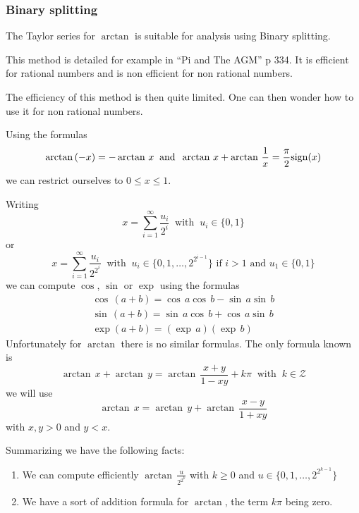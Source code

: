 \documentclass[12pt]{amsart}
\def\Z{{\mathcal Z}}
\begin{document}
\subsubsection{Binary splitting}
\noindent The Taylor series for $\arctan$ is suitable for analysis using Binary splitting.
\par This method is detailed for example in ``Pi and The AGM'' p 334. It is efficient for rational numbers and is non efficient for non rational numbers.
\par The efficiency of this method is then quite limited. One can then wonder how to use it for non rational numbers.
\par Using the formulas
\begin{equation*}
\arctan\,(-x)=-\arctan\,x\;\;\mbox{and}\;\;\arctan\,x+\arctan\,\frac{1}{x}=\frac{\pi}{2}{\rm sign}(x)
\end{equation*}
we can restrict ourselves to $0\leq x\leq 1$.
\par Writing
\begin{equation*}
x=\sum_{i=1}^{\infty} \frac{u_i}{2^i}\;\;\mbox{with}\;\;u_i\in\{0,1\}
\end{equation*}
or
\begin{equation*}
x=\sum_{i=1}^{\infty} \frac{u_i}{2^{2^i}}\;\;\mbox{with}\;\;u_i\in\{0,1,\dots,2^{2^{i-1}}\}\mbox{~if~}i>1\mbox{~and~}u_1\in \{0,1\}
\end{equation*}
we can compute $\cos$,  $\sin$ or $\exp$ using the formulas
\begin{equation*}
\begin{array}{c}
\cos\,(a+b)=\cos\,a\cos\,b-\sin\,a\sin\,b\\
\sin\,(a+b)=\sin\,a\cos\,b+\cos\,a\sin\,b\\
\exp(a+b)=(\exp\,a)(\exp\,b)
\end{array}
\end{equation*}
Unfortunately for $\arctan$ there is no similar formulas. The only formula known is
\begin{equation*}
\arctan\,x+\arctan\,y=\arctan\,\frac{x+y}{1-xy}+k\pi\;\;\mbox{with}\;\;k\in\Z
\end{equation*}
we will use
\begin{equation*}
\arctan\,x=\arctan\,y+\arctan\,\frac{x-y}{1+xy}
\end{equation*}
with $x,y>0$ and $y<x$.
\par Summarizing we have the following facts:
\begin{enumerate}
\item We can compute efficiently $\arctan\,\frac{u}{2^{2^k}}$ with $k\geq 0$ and $u\in\{0,1,\dots,2^{2^{k-1}}\}$
\item We have a sort of addition formula for $\arctan$, the term $k\pi$ being zero.
\end{enumerate}
\end{document}
